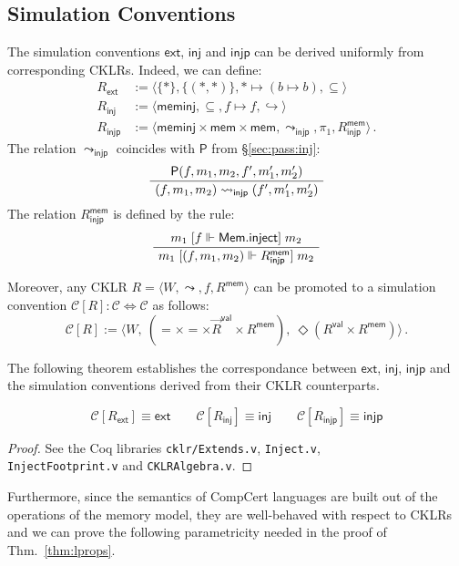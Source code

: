 \documentclass[sigplan,10pt,review,anonymous]{acmart}
\newcommand{\kw}[1]{\ensuremath{ \mathsf{#1} }}
\newcommand{\ifr}[1]{\mathrel{[{#1}]}}
\begin{document}
\subsection{Simulation Conventions} %

The simulation conventions \kw{ext}, \kw{inj} and \kw{injp}
can be derived uniformly from corresponding CKLRs.
Indeed, we can define:
\begin{align*}
  R_\kw{ext} &:=
    \langle \{*\}, \{(*,*)\}, * \mapsto (b \mapsto b), {\subseteq} \rangle
  \\
  R_\kw{inj} &:=
    \langle \kw{meminj}, {\subseteq}, f \mapsto f, {\hookrightarrow} \rangle
  \\
  R_\kw{injp} &:=
    \langle
      \kw{meminj} \times \kw{mem} \times \kw{mem},
      \leadsto_\kw{injp}, \pi_1, R_\kw{injp}^\kw{mem}
    \rangle \,.
\end{align*}
The relation $\leadsto_\kw{injp}$
coincides with $\kw{P}$ from \S\ref{sec:pass:inj}:
\[
  \AxiomC{$\kw{P}(f, m_1, m_2, f', m_1', m_2')$}
  \UnaryInfC{$(f, m_1, m_2) \leadsto_\kw{injp} (f', m_1', m_2')$}
  \DisplayProof
\]
The relation $R_\kw{injp}^\kw{mem}$ is defined by the rule:
\[
  \AxiomC{$m_1 \ifr{f \Vdash \kw{Mem.inject}} m_2$}
  \UnaryInfC{$m_1 \ifr{(f, m_1, m_2) \Vdash R_\kw{injp}^\kw{mem}} m_2$}
  \DisplayProof
\]

Moreover, any CKLR
$R = \langle W, {\leadsto}, f, R^\kw{mem} \rangle$ can be promoted to
a simulation convention
$\mathcal{C}[R] : \mathcal{C} \Leftrightarrow \mathcal{C}$
as follows:
\[
    \mathcal{C}[R] := \langle
      W, \:
      ({=} \times {=} \times \vec{R}^\kw{val} \times R^\kw{mem}), \:
      \Diamond (R^\kw{val} \times R^\kw{mem})
    \rangle \,.
\]

The following theorem
establishes the correspondance between \kw{ext}, \kw{inj}, \kw{injp}
and the simulation conventions derived from their CKLR counterparts.

\begin{theorem}
\[
    \mathcal{C}[R_\kw{ext}] \equiv \kw{ext} \qquad
    \mathcal{C}[R_\kw{inj}] \equiv \kw{inj} \qquad
    \mathcal{C}[R_\kw{injp}] \equiv \kw{injp}
\]
\begin{proof}
See the Coq libraries \texttt{cklr/Extends.v}, \texttt{Inject.v}, \\
\texttt{InjectFootprint.v} and \texttt{CKLRAlgebra.v}.
\end{proof}
\end{theorem}

Furthermore,
since the semantics of CompCert languages
are built out of the operations of the memory model,
they are well-behaved with respect to CKLRs and
we can prove the following parametricity
needed in the proof of Thm.~\ref{thm:lprops}.
\end{document}
